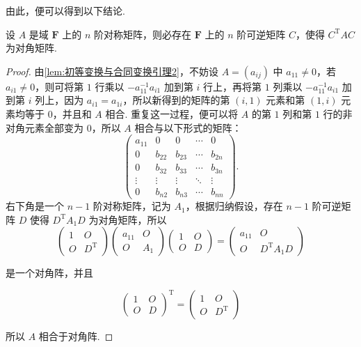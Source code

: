 由此，便可以得到以下结论.

\begin{theorem}{}{}
    设 $A$ 是域 $\mathbf{F}$ 上的 $n$ 阶对称矩阵，则必存在 $\mathbf{F}$ 上的 $n$ 阶可逆矩阵 $C$，使得 $C^\mathrm{T}AC$ 为对角矩阵.
\end{theorem}

\begin{proof}
    由\autoref{lem:初等变换与合同变换引理2}，不妨设 $A = (a_{ij})$ 中 $a_{11} \neq 0$，若 $a_{i1} \neq 0$，则可将第 $1$ 行乘以 $-a_{11}^{-1}a_{i1}$ 加到第 $i$ 行上，再将第 $1$ 列乘以 $-a_{11}^{-1}a_{i1}$ 加到第 $i$ 列上，因为 $a_{i1} = a_{1i}$，所以新得到的矩阵的第 $(i, 1)$ 元素和第 $(1, i)$ 元素均等于 $0$，并且和 $A$ 相合. 重复这一过程，便可以将 $A$ 的第 $1$ 列和第 $1$ 行的非对角元素全部变为 $0$，所以 $A$ 相合与以下形式的矩阵：
    \[
        \begin{pmatrix}
            a_{11} & 0 & 0 & \cdots & 0 \\
            0 & b_{22} & b_{23} & \cdots & b_{2n} \\
            0 & b_{32} & b_{33} & \cdots & b_{3n} \\
            \vdots & \vdots & \vdots & \ddots & \vdots \\
            0 & b_{n2} & b_{n3} & \cdots & b_{nn}
        \end{pmatrix}.
    \]
    右下角是一个 $n - 1$ 阶对称矩阵，记为 $A_1$，根据归纳假设，存在 $n - 1$ 阶可逆矩阵 $D$ 使得 $D^\mathrm{T}A_1D$ 为对角矩阵，所以
    \[
        \begin{pmatrix}
            1 & O \\
            O & D^\mathrm{T}
        \end{pmatrix}
        \begin{pmatrix}
            a_{11} & O \\
            O & A_1
        \end{pmatrix}
        \begin{pmatrix}
            1 & O \\
            O & D
        \end{pmatrix} = \begin{pmatrix}
            a_{11} & O \\
            O & D^\mathrm{T}A_1D
        \end{pmatrix}
    \]

    是一个对角阵，并且

    \[
        \begin{pmatrix}
            1 & O \\
            O & D
        \end{pmatrix}^\mathrm{T} = \begin{pmatrix}
            1 & O \\
            O & D^\mathrm{T}
        \end{pmatrix}
    \]

    所以 $A$ 相合于对角阵.
\end{proof}

